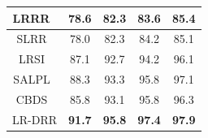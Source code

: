 \begin{table}
\begin{tabular}{|c|cccc|}
LRRR~\cite{LRLR_SLRR}                  & \multicolumn{1}{c|}{78.6}          & \multicolumn{1}{c|}{82.3}          & \multicolumn{1}{c|}{83.6}          & 85.4          \\ \hline
SLRR~\cite{LRLR_SLRR}                  & \multicolumn{1}{c|}{78.0}          & \multicolumn{1}{c|}{82.3}          & \multicolumn{1}{c|}{84.2}          & 85.1          \\ \hline
LRSI~\cite{LRSI}                 & \multicolumn{1}{c|}{87.1}          & \multicolumn{1}{c|}{92.7}          & \multicolumn{1}{c|}{94.2}          & 96.1          \\ \hline
SALPL~\cite{SALPL}                 & \multicolumn{1}{c|}{88.3}          & \multicolumn{1}{c|}{93.3}          & \multicolumn{1}{c|}{95.8}          & 97.1          \\ \hline
CBDS~\cite{CBDS}                  & \multicolumn{1}{c|}{85.8}          & \multicolumn{1}{c|}{93.1}          & \multicolumn{1}{c|}{95.8}          & 96.3          \\ \hline
LR-DRR                & \multicolumn{1}{c|}{\textbf{91.7}} & \multicolumn{1}{c|}{\textbf{95.8}} & \multicolumn{1}{c|}{\textbf{97.4}} & \textbf{97.9} \\ \hline
\end{tabular}
\end{table}
